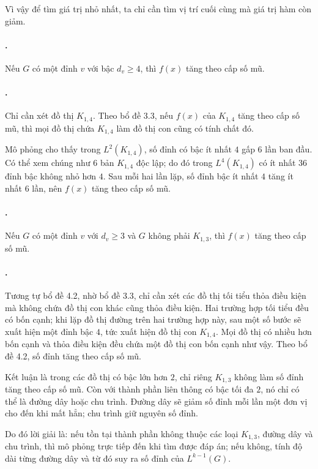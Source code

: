 \documentclass[11pt]{article}
\begin{document}
Vì vậy để tìm giá trị nhỏ nhất, ta chỉ cần tìm vị trí cuối cùng mà giá trị hàm
còn giảm.

\paragraph{.}
Nếu \(G\) có một đỉnh \(v\) với bậc \(d_v\ge 4\), thì \(f(x)\) tăng theo cấp
số mũ.

\paragraph{.}
Chỉ cần xét đồ thị \(K_{1,4}\). Theo bổ đề 3.3, nếu \(f(x)\) của \(K_{1,4}\)
tăng theo cấp số mũ, thì mọi đồ thị chứa \(K_{1,4}\) làm đồ thị con cũng có
tính chất đó.

Mô phỏng cho thấy trong \(L^2(K_{1,4})\), số đỉnh có bậc ít nhất \(4\) gấp
\(6\) lần ban đầu. Có thể xem chúng như \(6\) bản \(K_{1,4}\) độc lập; do đó
trong \(L^4(K_{1,4})\) có ít nhất \(36\) đỉnh bậc không nhỏ hơn \(4\). Sau mỗi
hai lần lặp, số đỉnh bậc ít nhất \(4\) tăng ít nhất \(6\) lần, nên \(f(x)\)
tăng theo cấp số mũ.

\paragraph{.}
Nếu \(G\) có một đỉnh \(v\) với \(d_v\ge 3\) và \(G\) không phải \(K_{1,3}\),
thì \(f(x)\) tăng theo cấp số mũ.

\paragraph{.}
Tương tự bổ đề 4.2, nhờ bổ đề 3.3, chỉ cần xét các đồ thị tối tiểu thỏa điều
kiện mà không chứa đồ thị con khác cũng thỏa điều kiện. Hai trường hợp tối
tiểu đều có bốn cạnh; khi lặp đồ thị đường trên hai trường hợp này, sau một số
bước sẽ xuất hiện một đỉnh bậc \(4\), tức xuất hiện đồ thị con \(K_{1,4}\).
Mọi đồ thị có nhiều hơn bốn cạnh và thỏa điều kiện đều chứa một đồ thị con bốn
cạnh như vậy. Theo bổ đề 4.2, số đỉnh tăng theo cấp số mũ.

Kết luận là trong các đồ thị có bậc lớn hơn \(2\), chỉ riêng \(K_{1,3}\) không
làm số đỉnh tăng theo cấp số mũ. Còn với thành phần liên thông có bậc tối đa
\(2\), nó chỉ có thể là đường dây hoặc chu trình. Đường dây sẽ giảm số đỉnh mỗi
lần một đơn vị cho đến khi mất hẳn; chu trình giữ nguyên số đỉnh.

Do đó lời giải là: nếu tồn tại thành phần không thuộc các loại \(K_{1,3}\),
đường dây và chu trình, thì mô phỏng trực tiếp đến khi tìm được đáp án; nếu
không, tính độ dài từng đường dây và từ đó suy ra số đỉnh của \(L^{k-1}(G)\).
\end{document}
